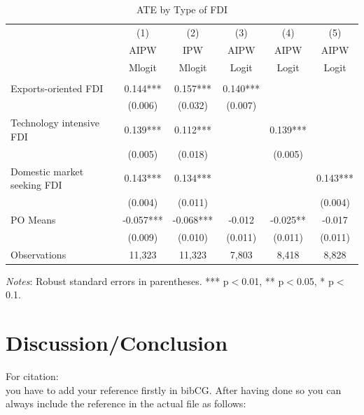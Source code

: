 \documentclass[a4paper,11pt]{scrartcl}
\begin{document}
\begin{table}[htbp]
	\centering
	\caption{ATE by Type of FDI}
	\label{tab:bytype}
\begin{threeparttable}

\begin{tabular}{lccccc} 
		\hline
		\hline
 	& (1) & (2) & (3) & (4) & (5) \\
	& AIPW & IPW  & AIPW  & AIPW & AIPW \\ 
	& Mlogit & Mlogit &Logit &Logit &Logit\\
		\hline
 			&  &  &  &  &   \\
Exports-oriented FDI 	& 0.144*** &   0.157*** & 0.140*** &  &  \\
 						& (0.006) &   (0.032) & (0.007) &  &\\
Technology intensive FDI & 0.139***   & 0.112*** &  & 0.139*** &   \\
 						 & (0.005)  & (0.018) &  &  (0.005)&  \\
Domestic market seeking FDI & 0.143*** &   0.134*** &  &  &0.143*** \\
 							& (0.004)   & (0.011) &  &  & (0.004)  \\
PO Means 		&   -0.057*** &   -0.068*** &-0.012  &-0.025**  & -0.017    \\
 				&   (0.009) &   (0.010) &  (0.011)&(0.011)  & (0.011) \\
Observations 	& 11,323  & 11,323 &  7,803  & 8,418 & 8,828  \\ 
		\hline
		\hline
\end{tabular}

\begin{tablenotes}[flushleft]
	\footnotesize
\item \textit{Notes}: Robust standard errors in parentheses. *** p$<$0.01, ** p$<$0.05, * p$<$0.1.
\end{tablenotes}

\end{threeparttable}
\end{table}


\section{Discussion/Conclusion}
For citation: \\
you have to add your reference firstly in bibCG. After having done so you can always include the reference in the actual file as follows: \\
 \citet{biddle1990sleep}\\
\citep[p.~35]{CaliendoHujerThomsen2008}	 \\
\end{document}
